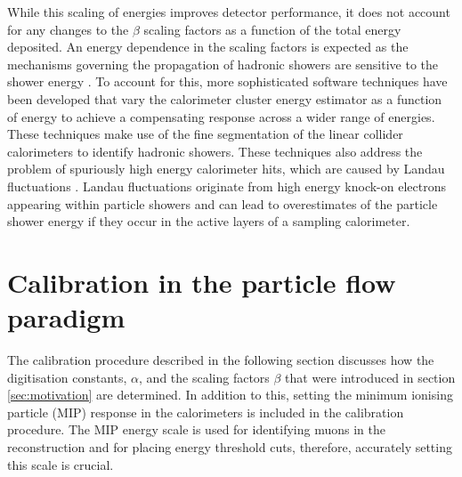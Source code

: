 While this scaling of energies improves detector performance, it does not account for any changes to the $\beta$ scaling factors as a function of the total energy deposited.  An energy dependence in the scaling factors is expected as the mechanisms governing the propagation of hadronic showers are sensitive to the shower energy \cite{Wigmans:2000vf}.  To account for this, more sophisticated software techniques have been developed that vary the calorimeter cluster energy estimator as a function of energy to achieve a compensating response across a wider range of energies.  These techniques make use of the fine segmentation of the linear collider calorimeters to identify hadronic showers.  These techniques also address the problem of spuriously high energy calorimeter hits, which are caused by Landau fluctuations \cite{Landau:1944if}.  Landau fluctuations originate from high energy knock-on electrons appearing within particle showers \cite{Bichsel:2004ej} and can lead to overestimates of the particle shower energy if they occur in the active layers of a sampling calorimeter.  


\section{Calibration in the particle flow paradigm}
\label{sec:overviewcalibration}
The calibration procedure described in the following section discusses how the digitisation constants, $\alpha$, and the scaling factors $\beta$ that were introduced in section \ref{sec:motivation} are determined.  In addition to this, setting the minimum ionising particle (MIP) response in the calorimeters is included in the calibration procedure.  The MIP energy scale is used for identifying muons in the reconstruction and for placing energy threshold cuts, therefore, accurately setting this scale is crucial.  

